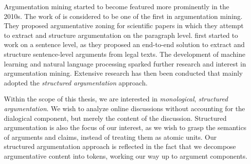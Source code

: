 Argumentation mining started to become featured more prominently in the 2010s.
The work of \citet{teufel2009towards} is considered to be one of the first in
argumentation mining. They proposed argumentative zoning for scientific papers
in which they attempt to extract and structure argumentation on the paragraph
level.  \citet{palau2009argumentation} first started to work on a sentence
level, as they proposed an end-to-end solution to extract and structure
sentence-level arguments from legal texts. The development of machine learning
and natural language processing sparked further research and interest in
argumentation mining. Extensive research has then been conducted that mainly
adopted the \emph{structured argumentation} approach.

Within the scope of this thesis, we are interested in \emph{monological},
\emph{structured argumentation}.  We wish to analyze online discussions without
accounting for the dialogical component, but merely the content of the
discussion. Structured argumentation is also the focus of our interest, as we
wish to grasp the semantics of arguments and claims, instead of treating them
as atomic units. Our structured argumentation approach is reflected in the fact that 
we decompose argumentative content into tokens, working our
way up to argument components. 


% 

